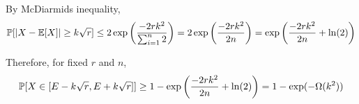 \documentclass[10pt]{article}
\begin{document}
\begin{solution}[Solution]
\begin{enumerate}[label=(\alph*)]
    By McDiarmids inequality,
    \begin{align*}
        \mathbb{P}[|X - \mathbb{E}[X]| \geq k\sqrt{r}] \leq 
        2 \exp \left( \frac{-2 r k^2}{\sum_{i=1}^{n}2} \right)
        = 2 \exp \left( \frac{-2 r k^2}{2n} \right)
        = \exp \left( \frac{-2 r k^2}{2n} + \ln(2) \right)
    \end{align*}

    Therefore, for fixed \( r \) and \( n \),
    \begin{align*}
        \mathbb{P}[X \in [E-k\sqrt{r},E+k\sqrt{r}]] \geq 1 - \exp \left( \frac{-2 rk^2}{2n} + \ln(2)\right)
        = 1 - \exp (- \Omega(k^2))
    \end{align*}
    


\end{enumerate}
\end{solution}
\end{document}
